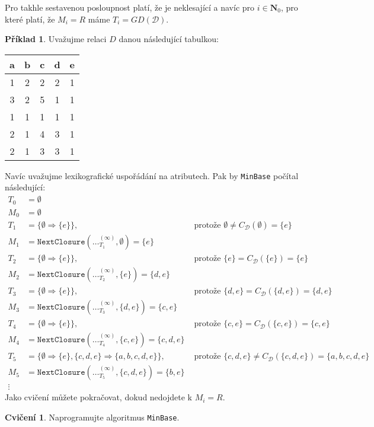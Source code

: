 \documentclass{article}
\theoremstyle {definition}
\newtheorem{example}{Příklad}
\newtheorem{exercise}{Cvičení}
\begin{document}
Pro takhle sestavenou posloupnost platí, že je neklesající a navíc pro
$i\in\mathbf N_0$, pro které platí, že $M_i=R$ máme
$T_i=GD(\mathcal D)$.

\begin{example}
  Uvažujme relaci $D$ danou následující tabulkou:

  \begin{center}
  \begin{tabular}{c c c c c}
    a & b & c & d & e \\
    \hline
    1 & 2 & 2 & 2 & 1 \\
    3 & 2 & 5 & 1 & 1 \\
    1 & 1 & 1 & 1 & 1 \\
    2 & 1 & 4 & 3 & 1 \\
    2 & 1 & 3 & 3 & 1 
  \end{tabular}
\end{center}
Navíc uvažujme lexikografické uspořádání na atributech. Pak by
\texttt{MinBase} počítal následující:
  \begin{align*}
    T_0&=\emptyset\\
    M_0&=\emptyset\\
    T_1&=\{\emptyset\Rightarrow \{e\}\},
       &\text{ protože } \emptyset\neq C_{\mathcal D}(\emptyset)=\{e\}\\
    M_1&=\texttt{NextClosure}(\dots_{T_1}^{(\infty)},\emptyset)=\{e\}\\
    T_2&=\{\emptyset\Rightarrow \{e\}\},
       &\text{ protože } \{e\} = C_{\mathcal D}(\{e\})=\{e\}\\
    M_2&=\texttt{NextClosure}(\dots_{T_2}^{(\infty)}, \{e\})=\{d,e\}\\
    T_3&=\{\emptyset\Rightarrow \{e\}\},
       &\text{ protože } \{d,e\} = C_{\mathcal D}(\{d,e\})=\{d,e\}\\
    M_3&=\texttt{NextClosure}(\dots_{T_3}^{(\infty)}, \{d,e\})=\{c,e\}\\
    T_4&=\{\emptyset\Rightarrow \{e\}\},
       &\text{ protože } \{c,e\} = C_{\mathcal D}(\{c,e\})=\{c,e\}\\
    M_4&=\texttt{NextClosure}(\dots_{T_4}^{(\infty)}, \{c,e\})=\{c,d,e\}\\
    T_5&=\{\emptyset\Rightarrow \{e\}, \{c,d,e\}\Rightarrow \{a,b,c,d,e\}\},
       &\text{ protože } \{c,d,e\} \neq C_{\mathcal D}(\{c,d,e\})=\{a,b,c,d,e\}\\
    M_5&=\texttt{NextClosure}(\dots_{T_5}^{(\infty)}, \{c,d,e\})=\{b,e\} \\
    \vdots
  \end{align*}
    Jako cvičení můžete pokračovat, dokud nedojdete k $M_i=R$.
\end{example}

\begin {exercise}
  Naprogramujte algoritmus \texttt {MinBase}.
\end {exercise}
\end{document}
